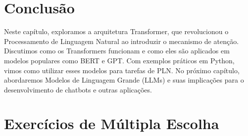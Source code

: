 \documentclass[14pt,a4paper,oneside]{book}
\begin{document}
\section{Conclusão}

Neste capítulo, exploramos a arquitetura Transformer, que revolucionou o Processamento de Linguagem Natural ao introduzir o mecanismo de atenção. Discutimos como os Transformers funcionam e como eles são aplicados em modelos populares como BERT e GPT. Com exemplos práticos em Python, vimos como utilizar esses modelos para tarefas de PLN. No próximo capítulo, abordaremos Modelos de Linguagem Grande (LLMs) e suas implicações para o desenvolvimento de chatbots e outras aplicações.

\section*{Exercícios de Múltipla Escolha}
\end{document}
